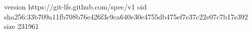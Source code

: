 version https://git-lfs.github.com/spec/v1
oid sha256:33b709a11fb708b76e426f3c9ca640e30e4755db475ef7e37c22e07c7b17e392
size 231961
